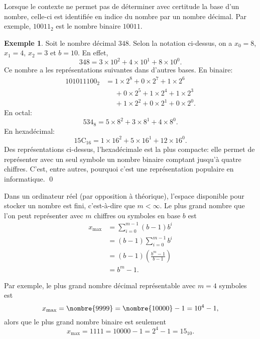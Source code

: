 \documentclass[letterpaper,11pt,english,french]{memoir}
\theoremstyle{plain}
\theoremstyle{definition}
\newtheorem{exemple}{Exemple}[chapter]
\theoremstyle{remark}
\begin{document}
Lorsque le contexte ne permet pas de déterminer avec certitude la base
d'un nombre, celle-ci est identifiée en indice du nombre par un nombre
décimal. Par exemple, $10011_2$ est le nombre binaire $10011$.

\begin{exemple}
  Soit le nombre décimal $348$. Selon la notation ci-dessus, on a $x_0 =
  8$, $x_1 = 4$, $x_2 = 3$ et $b = 10$. En effet,
  \begin{displaymath}
    348 = 3 \times 10^2 + 4 \times 10^1 + 8 \times 10^0.
  \end{displaymath}
  Ce nombre a les représentations suivantes dans d'autres bases. En binaire:
  \begin{align*}
    101011100_{2}
    &= 1 \times 2^8 + 0 \times 2^7 + 1 \times 2^6 \\
    &\phantom{=} + 0 \times 2^5 + 1 \times 2^4 + 1 \times 2^3 \\
    &\phantom{=} + 1 \times 2^2 + 0 \times 2^1 + 0 \times 2^0.
  \end{align*}
  En octal:
  \begin{equation*}
    534_{8} = 5 \times 8^2 + 3 \times 8^1 + 4 \times 8^0.
  \end{equation*}
  En hexadécimal:
  \begin{equation*}
    15\mathrm{C}_{16} = 1 \times 16^2 + 5 \times 16^1 + 12 \times 16^0.
  \end{equation*}
  Des représentations ci-dessus, l'hexadécimale est la plus compacte:
  elle permet de représenter avec un seul symbole un nombre binaire
  comptant jusqu'à quatre chiffres. C'est, entre autres, pourquoi
  c'est une représentation populaire en informatique.%
  \qed
\end{exemple}

Dans un ordinateur réel (par opposition à théorique), l'espace
disponible pour stocker un nombre est fini, c'est-à-dire que $m <
\infty$. Le plus grand nombre que l'on peut représenter avec $m$
chiffres ou symboles en base $b$ est
\begin{align*}
  x_{\text{max}}
  &= \sum_{i = 0}^{m - 1} (b - 1) b^i \\
  &= (b - 1) \sum_{i = 0}^{m - 1} b^i \\
  &= (b - 1)
  \left(
    \frac{b^m - 1}{b - 1}
  \right) \\
  &= b^m - 1.
\end{align*}

Par exemple, le plus grand nombre décimal représentable avec $m = 4$
symboles est
\begin{equation*}
  x_{\text{max}} = \nombre{9999} = \nombre{10000} - 1 = 10^4 - 1,
\end{equation*}
alors que le plus grand nombre binaire est seulement
\begin{equation*}
  x_{\text{max}} = 1111 = 10000 - 1 = 2^4 - 1 = 15_{10}.
\end{equation*}
\end{document}
